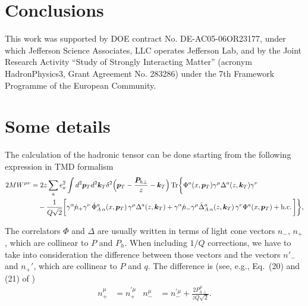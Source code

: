 \documentclass[preprintnumbers,floatfix,nofootinbib]{revtex4}
\newcommand{\nslash}{n \hspace{-0.24cm} / \,}
\newcommand{\Tr}{\operatorname*{Tr}\nolimits} %
\begin{document}
\section{Conclusions}



\begin{acknowledgments}
This work was supported by DOE contract No. DE-AC05-06OR23177,
under which Jefferson Science Associates, LLC operates Jefferson Lab, and 
by the Joint Research Activity ``Study of Strongly
Interacting Matter'' (acronym HadronPhysics3, Grant Agreement No. 283286) under
the 7th Framework Programme of the European Community.
\end{acknowledgments}

\appendix

\section{Some details}

The calculation of the hadronic tensor can be done starting from the following
expression in TMD formalism
\begin{equation} 
\begin{split} 
2M W^{\mu\nu} 
&= 2z \sum_a   e_a^2 \int d^2 \bm{p}_T d^2 \bm{k}_T 
\delta^2\Bigl(\bm{p}_T - \frac{\bm{P}_{h\perp}}{z}-\bm{k}_T\Bigr) 
\Tr \biggl\{
  \Phi^a (x,\bm{p}_T) \gamma^\mu \Delta^a (z,\bm{k}_T) \gamma^\nu
\\
& \quad 
- \frac{1}{Q\sqrt{2}} \biggl[
  \gamma^\alpha \nslash_+ \gamma^\nu \,
  \tilde{\Phi}^a_{A\, \alpha}(x,\bm{p}_T)\, \gamma^\mu \Delta^a(z,\bm{k}_T) 
+ \gamma^\alpha \nslash_- \gamma^\mu
  \tilde{\Delta}^a_{A\, \alpha} (z,\bm{k}_T)\, \gamma^\nu 
  \Phi^a (x,\bm{p}_T)  
  + \mathrm{h.c.} \,\biggr] \biggr\},
\label{eq2}
\end{split} 
\end{equation} 

The correlators $\Phi$ and $\Delta$ are usually written in terms of light cone
vectors $n_-$, $n_+$, which  are collinear to $P$ and $P_h$.
When including $1/Q$ corrections, we have to take into consideration the
difference between those vectors and the vectors $n'_-$ and
$n_+'$, which are collinear to $P$ and $q$. The difference is (see,
e.g., Eq.~(20) and (21) of \cite{Mulders:1995dh})
\begin{align}
n_+^{\mu} &= n_+^{\prime \mu}
&
n_-^{\mu} &=  n_-^{\prime \mu}
+ \frac{2 P_{h\perp}^{\mu}}{z Q \sqrt{2}}
.
\end{align} 
\end{document}
